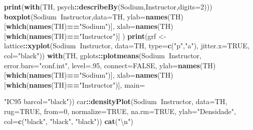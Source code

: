 \documentclass[]{article}
\newenvironment{Shaded}{\begin{snugshade}}{\end{snugshade}}
\newcommand{\KeywordTok}[1]{\textcolor[rgb]{0.13,0.29,0.53}{\textbf{#1}}}
\newcommand{\DataTypeTok}[1]{\textcolor[rgb]{0.13,0.29,0.53}{#1}}
\newcommand{\DecValTok}[1]{\textcolor[rgb]{0.00,0.00,0.81}{#1}}
\newcommand{\CharTok}[1]{\textcolor[rgb]{0.31,0.60,0.02}{#1}}
\newcommand{\StringTok}[1]{\textcolor[rgb]{0.31,0.60,0.02}{#1}}
\newcommand{\OtherTok}[1]{\textcolor[rgb]{0.56,0.35,0.01}{#1}}
\newcommand{\OperatorTok}[1]{\textcolor[rgb]{0.81,0.36,0.00}{\textbf{#1}}}
\newcommand{\NormalTok}[1]{#1}
\begin{document}
\begin{Shaded}
\begin{Highlighting}[]
\KeywordTok{print}\NormalTok{(}\KeywordTok{with}\NormalTok{(TH, psych}\OperatorTok{::}\KeywordTok{describeBy}\NormalTok{(Sodium,Instructor,}\DataTypeTok{digits=}\DecValTok{2}\NormalTok{)))}
\KeywordTok{boxplot}\NormalTok{(Sodium}\OperatorTok{~}\NormalTok{Instructor,}\DataTypeTok{data=}\NormalTok{TH,}
        \DataTypeTok{ylab=}\KeywordTok{names}\NormalTok{(TH)[}\KeywordTok{which}\NormalTok{(}\KeywordTok{names}\NormalTok{(TH)}\OperatorTok{==}\StringTok{"Sodium"}\NormalTok{)],}
        \DataTypeTok{xlab=}\KeywordTok{names}\NormalTok{(TH)[}\KeywordTok{which}\NormalTok{(}\KeywordTok{names}\NormalTok{(TH)}\OperatorTok{==}\StringTok{"Instructor"}\NormalTok{)]}
\NormalTok{)}
\KeywordTok{print}\NormalTok{(grf <-}\StringTok{ }\NormalTok{lattice}\OperatorTok{::}\KeywordTok{xyplot}\NormalTok{(Sodium}\OperatorTok{~}\NormalTok{Instructor, }\DataTypeTok{data=}\NormalTok{TH, }\DataTypeTok{type=}\KeywordTok{c}\NormalTok{(}\StringTok{"p"}\NormalTok{,}\StringTok{"a"}\NormalTok{),}
                             \DataTypeTok{jitter.x=}\OtherTok{TRUE}\NormalTok{, }\DataTypeTok{col=}\StringTok{"black"}\NormalTok{))}
\KeywordTok{with}\NormalTok{(TH, gplots}\OperatorTok{::}\KeywordTok{plotmeans}\NormalTok{(Sodium}\OperatorTok{~}\NormalTok{Instructor,}
                           \DataTypeTok{error.bars=}\StringTok{"conf.int"}\NormalTok{, }\DataTypeTok{level=}\NormalTok{.}\DecValTok{95}\NormalTok{,}
                           \DataTypeTok{connect=}\OtherTok{FALSE}\NormalTok{,}
                           \DataTypeTok{ylab=}\KeywordTok{names}\NormalTok{(TH)[}\KeywordTok{which}\NormalTok{(}\KeywordTok{names}\NormalTok{(TH)}\OperatorTok{==}\StringTok{"Sodium"}\NormalTok{)],}
                           \DataTypeTok{xlab=}\KeywordTok{names}\NormalTok{(TH)[}\KeywordTok{which}\NormalTok{(}\KeywordTok{names}\NormalTok{(TH)}\OperatorTok{==}\StringTok{"Instructor"}\NormalTok{)],}
                           \DataTypeTok{main=}\StringTok{"IC95%"}\NormalTok{,}
                           \DataTypeTok{barcol=}\StringTok{"black"}\NormalTok{))}
\NormalTok{car}\OperatorTok{::}\KeywordTok{densityPlot}\NormalTok{(Sodium}\OperatorTok{~}\NormalTok{Instructor, }\DataTypeTok{data=}\NormalTok{TH, }\DataTypeTok{rug=}\OtherTok{TRUE}\NormalTok{, }\DataTypeTok{from=}\DecValTok{0}\NormalTok{, }\DataTypeTok{normalize=}\OtherTok{TRUE}\NormalTok{,}
                 \DataTypeTok{na.rm=}\OtherTok{TRUE}\NormalTok{, }\DataTypeTok{ylab=}\StringTok{"Densidade"}\NormalTok{, }\DataTypeTok{col=}\KeywordTok{c}\NormalTok{(}\StringTok{"black"}\NormalTok{, }\StringTok{"black"}\NormalTok{, }\StringTok{"black"}\NormalTok{))}
\KeywordTok{cat}\NormalTok{(}\StringTok{"}\CharTok{\textbackslash{}n}\StringTok{"}\NormalTok{)}

}
\end{Highlighting}
\end{Shaded}
\end{document}
